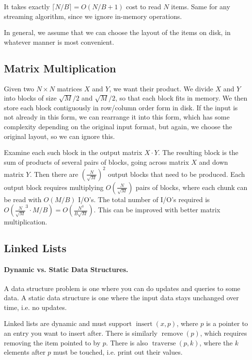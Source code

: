 \documentclass[11pt]{article}
\newcommand{\on}{\operatorname}
\begin{document}
It takes exactly $\lceil N/B\rceil = O(N / B+1)$ cost to read $N$ items. Same for any streaming algorithm, since we ignore in-memory operations.

In general, we assume that we can choose the layout of the items on disk, in whatever manner is most convenient.

\subsection{Matrix Multiplication}

Given two $N\times N$ matrices $X$ and $Y$, we want their product. We divide $X$ and $Y$ into blocks of size $\sqrt{M} / 2$ and $\sqrt{M} / 2$, so that each block fits in memory. We then store each block contiguously in row/column order form in disk. If the input is not already in this form, we can rearrange it into this form, which has some complexity depending on the original input format, but again, we choose the original layout, so we can ignore this.

Examine each such block in the output matrix $X \cdot Y$. The resulting block is the sum of products of several pairs of blocks, going across matrix $X$ and down matrix $Y$.
Then there are $(\frac{N}{\sqrt{M}})^2$ output blocks that need to be produced.
Each output block requires multiplying $O(\frac{N}{\sqrt{M}})$ pairs of blocks, where each chunk can be read with $O(M / B)$ I/O's.
The total number of I/O's required is $O(\frac{N}{\sqrt{M}}^3 \cdot M/B) = O(\frac{N^3}{B\sqrt{M}})$. This can be improved with better matrix multiplication.

\subsection{Linked Lists}

\paragraph{Dynamic vs. Static Data Structures.} A data structure problem is one where you can do updates and queries to some data. A static data structure is one where the input data stays unchanged over time, i.e. no updates.

Linked lists are dynamic and must support $\on{insert}(x, p)$, where $p$ is a pointer to an entry you want to insert after. There is similarly $\on{remove}(p)$, which requires removing the item pointed to by $p$. There is also $\on{traverse}(p, k)$, where the $k$ elements after $p$ must be touched, i.e. print out their values.
\end{document}
